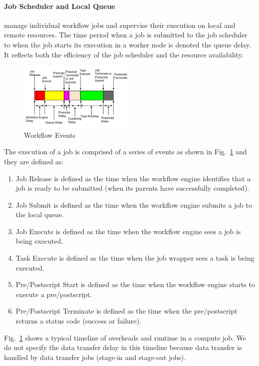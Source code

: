 \paragraph{Job Scheduler and Local Queue} manage individual workflow jobs and supervise their execution on local and remote resources. The time period when a job is submitted to the job scheduler to when the job starts its execution in a worker node is denoted the queue delay. It reflects both the efficiency of the job scheduler and the resource availability. 


\begin{figure}[h!]
	\centering
    \includegraphics[width=0.5\textwidth]{figures/model/overhead.pdf}
    \caption{Workflow Events}
    \label{fig:model_overhead}
\end{figure}



The execution of a job is comprised of a series of events as shown in Fig.~\ref{fig:model_overhead} and they are defined as:

\begin{enumerate}
\item Job Release is defined as the time when the workflow engine identifies that a job is ready to be submitted (when its parents have successfully completed). 
\item Job Submit is defined as the time when the workflow engine submits a job to the local queue. 
\item Job Execute is defined as the time when the workflow engine sees a job is being executed. 
\item Task Execute is defined as the time when the job wrapper sees a task is being executed. 
\item Pre/Postscript Start is defined as the time when the workflow engine starts to execute a pre/postscript. 
\item Pre/Postscript Terminate is defined as the time when the pre/postscript returns a status code (success or failure). 
\end{enumerate}

Fig.~\ref{fig:model_overhead} shows a typical timeline of overheads and runtime in a compute job. We do not specify the data transfer delay in this timeline because data transfer is handled by data transfer jobs (stage-in and stage-out jobs). 

